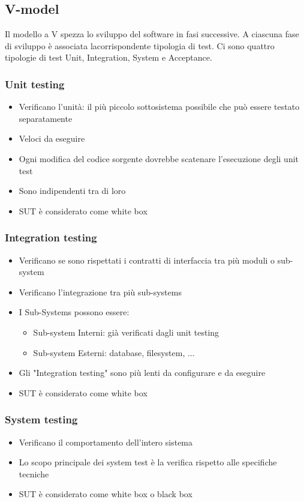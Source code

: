 \subsection{V-model}
Il modello a V spezza lo sviluppo del software in fasi successive. A ciascuna fase di sviluppo è associata lacorrispondente tipologia di test.
Ci sono quattro tipologie di test Unit, Integration, System e Acceptance.

\subsubsection{Unit testing}
\begin{itemize}
    \item Verificano l'unità: il più piccolo sottosistema possibile che può essere testato separatamente
    \item Veloci da eseguire
    \item Ogni modifica del codice sorgente dovrebbe scatenare l'esecuzione degli unit test
    \item Sono indipendenti tra di loro
    \item SUT è considerato come white box
\end{itemize}

\subsubsection{Integration testing}
\begin{itemize}
    \item Verificano se sono rispettati i contratti di interfaccia tra più moduli o sub-system
    \item Verificano l'integrazione tra più sub-systems
    \item I Sub-Systems possono essere:
    \begin{itemize}
        \item Sub-system Interni: già verificati dagli unit testing
        \item Sub-system Esterni: database, filesystem, ...
    \end{itemize}
    \item Gli "Integration testing" sono più lenti da configurare e da eseguire
    \item SUT è considerato come white box
\end{itemize}

\subsubsection{System testing}
\begin{itemize}
    \item Verificano il comportamento dell'intero sistema
    \item Lo scopo principale dei system test è la verifica rispetto alle specifiche tecniche
    \item SUT è considerato come white box o black box
\end{itemize}

